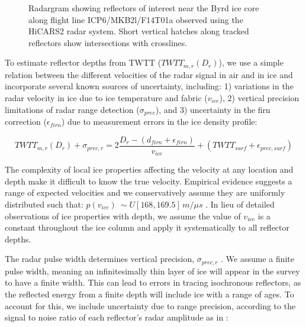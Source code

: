 \begin{figure}[h]
\centering
{}
\caption{Radargram showing reflectors of interest near the Byrd ice core along flight line ICP6/MKB2l/F14T01a observed using the HiCARS2 radar system. Short vertical hatches along tracked reflectors show intersections with crosslines.}
\label{fig:layergram}
\end{figure}


To estimate reflector depths from TWTT ($TWTT_{m,r}(D_r)$), we use a simple relation between the different velocities of the radar signal in air and in ice and incorporate several known sources of uncertainty, including: 1) variations in the radar velocity in ice due to ice temperature and fabric ($v_{ice}$), 2) vertical precision limitations of radar range detection ($\sigma_{prec}$), and 3) uncertainty in the firn correction ($\epsilon_{firn}$) due to measurement errors in the ice density profile:

\begin{equation}\label{deptheqn}
TWTT_{m,r}(D_r) + \sigma_{prec,r} = 2 \frac{D_r - (d_{firn}+\epsilon_{firn})}{v_{ice}} + (TWTT_{surf} + \epsilon_{prec,surf})
\end{equation}

The complexity of local ice properties affecting the velocity at any location and depth make it difficult to know the true velocity. Empirical evidence suggests a range of expected velocities and we conservatively assume they are uniformly distributed such that: $p(v_{ice}) ~\sim U[168,169.5]\,m/{\mu}s$ \citep{fujita2000}. In lieu of detailed observations of ice properties with depth, we assume the value of $v_{ice}$ is a constant throughout the ice column and apply it systematically to all reflector depths.

The radar pulse width determines vertical precision, $\sigma_{prec,r}$ \citep{millar1982}. We assume a finite pulse width, meaning an infinitesimally thin layer of ice will appear in the survey to have a finite width. This can lead to errors in tracing isochronous reflectors, as the reflected energy from a finite depth will include ice with a range of ages. To account for this, we include uncertainty due to range precision, according to the signal to noise ratio of each reflector's radar amplitude as in \citet{cavitte2016}:

